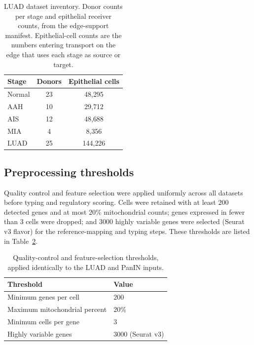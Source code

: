 \begin{table}[htbp]
  \centering
  \caption[LUAD dataset inventory]{LUAD dataset inventory. Donor counts per stage and epithelial
  receiver counts, from the edge-support manifest. Epithelial-cell counts are the numbers entering
  transport on the edge that uses each stage as source or target.}
  \label{tab:app-c-inventory}
  \begin{tabular}{lcc}
    \toprule
    Stage & Donors & Epithelial cells \\
    \midrule
    Normal & 23 & 48{,}295 \\
    AAH    & 10 & 29{,}712 \\
    AIS    & 12 & 48{,}688 \\
    MIA    & 4  & 8{,}356 \\
    LUAD   & 25 & 144{,}226 \\
    \bottomrule
  \end{tabular}
\end{table}

\subsection{Preprocessing thresholds}\label{sec:app-c-preproc}

Quality control and feature selection were applied uniformly across all datasets before typing and
regulatory scoring. Cells were retained with at least $200$ detected genes and at most $20\%$
mitochondrial counts; genes expressed in fewer than $3$ cells were dropped; and $3000$ highly
variable genes were selected (Seurat v3 flavor) for the reference-mapping and typing steps.
These thresholds are listed in Table~\ref{tab:app-c-qc}.

\begin{table}[htbp]
  \centering
  \caption[Preprocessing thresholds]{Quality-control and feature-selection thresholds, applied
  identically to the LUAD and PanIN inputs.}
  \label{tab:app-c-qc}
  \begin{tabular}{ll}
    \toprule
    Threshold & Value \\
    \midrule
    Minimum genes per cell        & $200$ \\
    Maximum mitochondrial percent & $20\%$ \\
    Minimum cells per gene        & $3$ \\
    Highly variable genes         & $3000$ (Seurat v3) \\
    \bottomrule
  \end{tabular}
\end{table}

